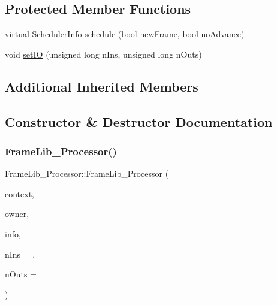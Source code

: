 \subsection*{Protected Member Functions}
\begin{DoxyCompactItemize}
\item 
virtual \hyperlink{struct_frame_lib___d_s_p_1_1_scheduler_info}{Scheduler\+Info} \hyperlink{class_frame_lib___processor_a2487e6433f6a5e79014664a0500ccc24}{schedule} (bool new\+Frame, bool no\+Advance)
\item 
void \hyperlink{class_frame_lib___processor_a84035040e5e1cff07e16502ee290881e}{set\+IO} (unsigned long n\+Ins, unsigned long n\+Outs)
\end{DoxyCompactItemize}
\subsection*{Additional Inherited Members}


\subsection{Constructor \& Destructor Documentation}
\mbox{\label{class_frame_lib___processor_acd8ddc4d9b3d10ef8cd6b63716979711}} 
\subsubsection{\texorpdfstring{Frame\+Lib\+\_\+\+Processor()}{FrameLib\_Processor()}}
{\footnotesize\ttfamily Frame\+Lib\+\_\+\+Processor\+::\+Frame\+Lib\+\_\+\+Processor (\begin{DoxyParamCaption}\item[{\hyperlink{class_frame_lib___context}{Frame\+Lib\+\_\+\+Context}}]{context,  }\item[{void $\ast$}]{owner,  }\item[{\hyperlink{class_frame_lib___parameters_1_1_info}{Frame\+Lib\+\_\+\+Parameters\+::\+Info} $\ast$}]{info,  }\item[{unsigned long}]{n\+Ins = {},  }\item[{unsigned long}]{n\+Outs = {} }\end{DoxyParamCaption})\hspace{0.3cm}{\ttfamily [inline]}}



